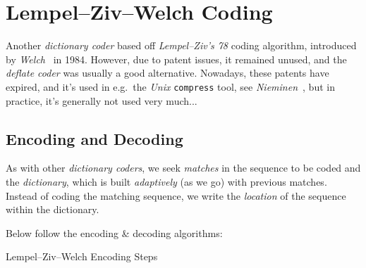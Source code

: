 \documentclass[a4paper, twocolumn]{article}
\begin{document}
    \section{Lempel--Ziv--Welch Coding} \label{sec:lempel_ziv_welch}

        Another \emph{dictionary coder} based off \emph{Lempel--Ziv's 78} coding algorithm, introduced by \emph{Welch}~\cite{welch1984technique} in 1984. However, due to patent issues, it remained unused, and the \emph{deflate coder} was usually a good alternative. Nowadays, these patents have expired, and it's used in e.g.\ the \emph{Unix} \texttt{compress} tool, see \emph{Nieminen}~\cite{nieminen2007efficient}, but in practice, it's generally not used very much...

        \vspace{-0.1in}
        \subsection{Encoding and Decoding} \label{sec:lzw_encoding_decoding}

        As with other \emph{dictionary coders}, we seek \emph{matches} in the sequence to be coded and the \emph{dictionary}, which is built \emph{adaptively} (as we go) with previous matches. Instead of coding the matching sequence, we write the \emph{location} of the sequence within the dictionary.

        Below follow the encoding \& decoding algorithms:

        \begin{algorithm}
            \begin{algorithmic}
                    \ELSE
                    \ENDIF
                \ENDWHILE
            \end{algorithmic}
            \caption{Lempel--Ziv--Welch Encoding Steps}
            \label{alg:lzwz}
        \end{algorithm}
\end{document}
